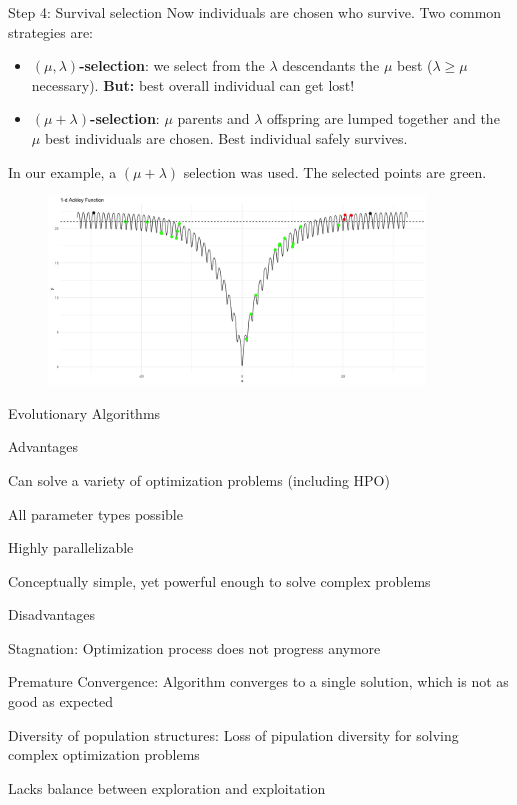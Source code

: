   \begin{frame}[allowframebreaks]{Step 4: Survival selection}
  Now individuals are chosen who survive. Two common strategies are:
  \begin{itemize}
  \item \textbf{$(\mu, \lambda)$-selection}: we select from the $\lambda$ descendants the $\mu$ best ($\lambda \ge \mu$ necessary).
  \textbf{But:} best overall individual can get lost!
  \item \textbf{$(\mu + \lambda)$-selection}: $\mu$ parents and $\lambda$ offspring are lumped together and the $\mu$ best individuals are chosen.
  Best individual safely survives.
  \end{itemize}

  \framebreak

  In our example, a $(\mu + \lambda)$ selection was used. The selected points are green.

  \begin{center}
    \begin{figure}
      \includegraphics[width=\textwidth, height=5cm]{images/ea_ex5.png}
    \end{figure}
  \end{center}

\end{frame}

\begin{frame}{Evolutionary Algorithms}

  \begin{blocki}{Advantages}
    \item Can solve a variety of optimization problems (including HPO)
    \item All parameter types possible
    \item Highly parallelizable
    \item Conceptually simple, yet powerful enough to solve complex problems
    \end{blocki}

    \begin{blocki}{Disadvantages}
    \item Stagnation: Optimization process does not progress anymore
    \item Premature Convergence: Algorithm converges to a single solution, which is not as good as expected
    \item Diversity of population structures: Loss of pipulation diversity for solving complex optimization problems
    \item Lacks balance between exploration and exploitation
    \end{blocki}

\end{frame}

